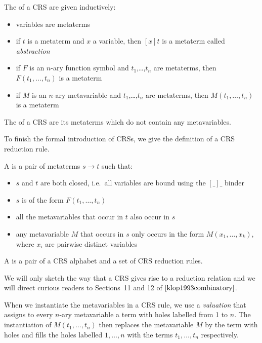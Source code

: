 \begin{definition}
  The  of a CRS are given inductively:
  \begin{itemize}
  \item variables are metaterms
  \item if $t$ is a metaterm and $x$ a variable, then $[x]t$ is a metaterm
    called \emph{abstraction}
  \item if $F$ is an $n$-ary function symbol and $t_1$,\ldots,$t_n$ are
    metaterms, then $F(t_1,\ldots,t_n)$ is a metaterm
  \item if $M$ is an $n$-ary metavariable and $t_1$,\ldots,$t_n$ are
    metaterms, then $M(t_1,\ldots,t_n)$ is a metaterm
  \end{itemize}
\end{definition}

\begin{definition}
  The  of a CRS are its metaterms which do not contain any
  metavariables.
\end{definition}

To finish the formal introduction of CRSs, we give the definition of a CRS
reduction rule.

\begin{definition}
  A  is a pair of metaterms $s \to t$ such that:
  \begin{itemize}
  \item $s$ and $t$ are both closed, i.e.\ all variables are bound using
    the $[\_]\_$ binder
  \item $s$ is of the form $F(t_1,\ldots,t_n)$
  \item all the metavariables that occur in $t$ also occur in $s$
  \item any metavariable $M$ that occurs in $s$ only occurs in the form
    $M(x_1,\ldots,x_k)$, where $x_i$ are pairwise distinct variables
  \end{itemize}
\end{definition}

\begin{definition}
  A  is a pair of a CRS alphabet
  and a set of CRS reduction rules.
\end{definition}

We will only sketch the way that a CRS gives rise to a reduction relation
and we will direct curious readers to Sections~11 and 12 of
$\cite{klop1993combinatory}$.

When we instantiate the metavariables in a CRS rule, we use a
\emph{valuation} that assigns to every $n$-ary metavariable a term with
holes labelled from 1 to $n$. The instantiation of $M(t_1,\ldots,t_n)$ then
replaces the metavariable $M$ by the term with holes and fills the holes
labelled $1,\ldots,n$ with the terms $t_1,\ldots,t_n$ respectively.

